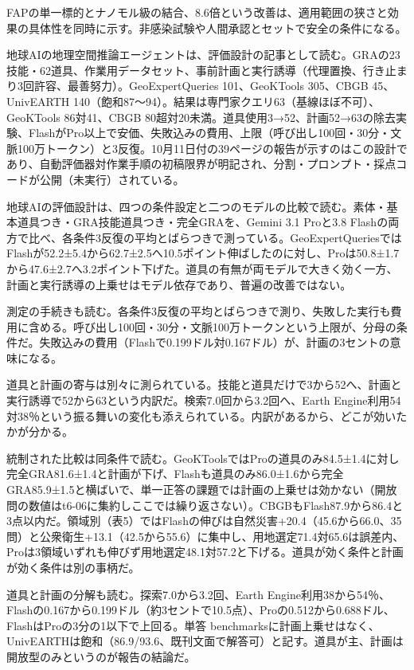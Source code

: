 \documentclass[lualatex,a4paper,10pt]{jlreq}
\begin{document}
FAPの単一標的とナノモル級の結合、8.6倍という改善は、適用範囲の狭さと効果の具体性を同時に示す。非感染試験や人間承認とセットで安全の条件になる。
\cite{B46,B83,B44,B43,B45}


地球AIの地理空間推論エージェントは、評価設計の記事として読む。GRAの23技能・62道具、作業用データセット、事前計画と実行誘導（代理置換、行き止まり3回許容、最善努力）。GeoExpertQueries 101、GeoKTools 305、CBGB 45、UnivEARTH 140（飽和87〜94）。結果は専門家クエリ63（基線ほぼ不可）、GeoKTools 86対41、CBGB 80超対20未満。道具使用3→52、計画52→63の除去実験、FlashがPro以上で安価、失敗込みの費用、上限（呼び出し100回・30分・文脈100万トークン）と3反復。10月11日付の39ページの報告が示すのはこの設計であり、自動評価器対作業手順の初稿限界が明記され、分割・プロンプト・採点コードが公開（未実行）されている。
\cite{B47,B84,B48,B61}


地球AIの評価設計は、四つの条件設定と二つのモデルの比較で読む。素体・基本道具つき・GRA技能道具つき・完全GRAを、Gemini 3.1 Proと3.8 Flashの両方で比べ、各条件3反復の平均とばらつきで測っている。GeoExpertQueriesではFlashが52.2±5.4から62.7±2.5へ10.5ポイント伸ばしたのに対し、Proは50.8±1.7から47.6±2.7へ3.2ポイント下げた。道具の有無が両モデルで大きく効く一方、計画と実行誘導の上乗せはモデル依存であり、普遍の改善ではない。
\cite{B47,B84,B48}


測定の手続きも読む。各条件3反復の平均とばらつきで測り、失敗した実行も費用に含める。呼び出し100回・30分・文脈100万トークンという上限が、分母の条件だ。失敗込みの費用（Flashで0.199ドル対0.167ドル）が、計画の3セントの意味になる。
\cite{B47,B84,B48}


道具と計画の寄与は別々に測られている。技能と道具だけで3から52へ、計画と実行誘導で52から63という内訳だ。検索7.0回から3.2回へ、Earth Engine利用54対38％という振る舞いの変化も添えられている。内訳があるから、どこが効いたかが分かる。
\cite{B47,B84,B48}


統制された比較は同条件で読む。GeoKToolsではProの道具のみ84.5±1.4に対し完全GRA81.6±1.4と計画が下げ、Flashも道具のみ86.0±1.6から完全GRA85.9±1.5と横ばいで、単一正答の課題では計画の上乗せは効かない（開放問の数値はt6-06に集約しここでは繰り返さない）。CBGBもFlash87.9から86.4と3点以内だ。領域別（表5）ではFlashの伸びは自然災害+20.4（45.6から66.0、35問）と公衆衛生+13.1（42.5から55.6）に集中し、用地選定71.4対65.6は誤差内、Proは3領域いずれも伸びず用地選定48.1対57.2と下げる。道具が効く条件と計画が効く条件は別の事柄だ。
\cite{B47,B84,B48}


道具と計画の分解も読む。探索7.0から3.2回、Earth Engine利用38から54％、Flashの0.167から0.199ドル（約3セントで10.5点）、Proの0.512から0.688ドル、FlashはProの3分の1以下で上回る。単答 benchmarksに計画上乗せはなく、UnivEARTHは飽和（86.9/93.6、既刊文面で解答可）と記す。道具が主、計画は開放型のみというのが報告の結論だ。
\cite{B47,B84,B48}
\end{document}
